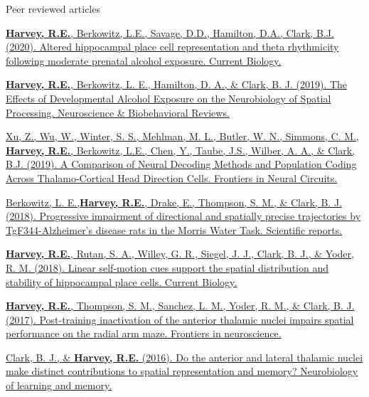 


\begin{cventries}

\cventry
    {Peer reviewed articles} %
    {} %
    {} %
    {} %
    {
      \begin{cvitems} %
      \setlength\itemsep{0.5em}
            \item {\href{https://doi.org/10.1016/j.cub.2020.06.077}{\textbf{Harvey, R.E.}, Berkowitz, L.E., Savage, D.D., Hamilton, D.A., Clark, B.J. (2020). Altered hippocampal place cell representation and theta rhythmicity following moderate prenatal alcohol exposure. Current Biology.}} 
            \item {\href{https://doi.org/10.1016/j.neubiorev.2019.09.018}{\textbf{Harvey, R.E.}, Berkowitz, L. E., Hamilton, D. A., \& Clark, B. J. (2019). The Effects of Developmental Alcohol Exposure on the Neurobiology of Spatial Processing. Neuroscience \& Biobehavioral Reviews.}}
            \item {\href{https://doi.org/10.3389/fncir.2019.00075}{Xu, Z., Wu, W., Winter, S. S., Mehlman, M. L., Butler, W. N., Simmons, C. M., \textbf{Harvey, R.E.}, Berkowitz, L.E., Chen, Y., Taube, J.S., Wilber, A. A., \& Clark, B.J. (2019). A Comparison of Neural Decoding Methods and Population Coding Across Thalamo-Cortical Head Direction Cells. Frontiers in Neural Circuits.}}
            \item {\href{https://doi.org/10.1038/s41598-018-34368-w}{Berkowitz, L. E.,\textbf{Harvey, R.E.}, Drake, E., Thompson, S. M., \& Clark, B. J. (2018). Progressive impairment of directional and spatially precise trajectories by TgF344-Alzheimer’s disease rats in the Morris Water Task. Scientific reports.}} 
            \item {\href{https://doi.org/10.1016/j.cub.2018.04.034}{\textbf{Harvey, R.E.}, Rutan, S. A., Willey, G. R., Siegel, J. J., Clark, B. J., \& Yoder, R. M. (2018). Linear self-motion cues support the spatial distribution and stability of hippocampal place cells. Current Biology.}}
            \item {\href{https://doi.org/10.3389/fnins.2017.00094}{\textbf{Harvey, R.E.}, Thompson, S. M., Sanchez, L. M., Yoder, R. M., \& Clark, B. J. (2017). Post-training inactivation of the anterior thalamic nuclei impairs spatial performance on the radial arm maze. Frontiers in neuroscience.}} 
            \item {\href{https://doi.org/10.1016/j.nlm.2016.06.002}{Clark, B. J., \& \textbf{Harvey, R.E.} (2016). Do the anterior and lateral thalamic nuclei make distinct contributions to spatial representation and memory? Neurobiology of learning and memory.}}
      \end{cvitems}
    }
    

\end{cventries}

